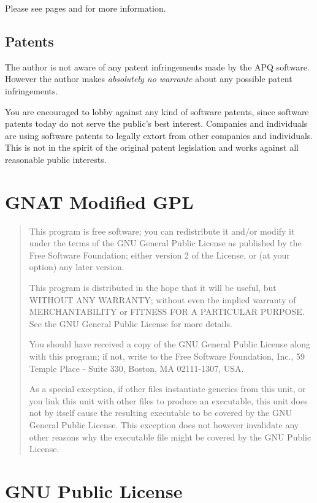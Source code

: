 \documentclass[english,letterpaper]{book}
\begin{document}
Please see pages \pageref{gmgpl} and \pageref{gpl} for more information.


\section*{Patents}

The author is not aware of any patent infringements made by
the APQ software. However the author makes \emph{absolutely no warrante}
about any possible patent infringements.

You are encouraged to lobby against any kind of software patents, since
software patents today do not serve the public's best interest.
Companies and individuals are using software patents to
legally extort from other companies and individuals. This is not in
the spirit of the original patent legislation and works against
all reasonable public interests.

\chapter{GNAT Modified GPL}
\label{gmgpl}


\begin{quote}
This program is free software; you can redistribute it and/or
modify it under the terms of the GNU General Public License as
published by the Free Software Foundation; either version 2 of the
License, or (at your option) any later version.

This program is distributed in the hope that it will be useful,
but WITHOUT ANY WARRANTY; without even the implied warranty of
MERCHANTABILITY or FITNESS FOR A PARTICULAR PURPOSE.  See the GNU
General Public License for more details.

You should have received a copy of the GNU General Public License
along with this program; if not, write to the Free Software
Foundation, Inc., 59 Temple Place - Suite 330, Boston, MA
02111-1307, USA.

As a special exception, if other files instantiate generics from
this unit, or you link this unit with other files to produce an
executable, this unit does not by itself cause the resulting
executable to be covered by the GNU General Public License. This
exception does not however invalidate any other reasons why the
executable file might be covered by the GNU Public License.
\end{quote}

\chapter{GNU Public License}
\label{gpl}
\end{document}
